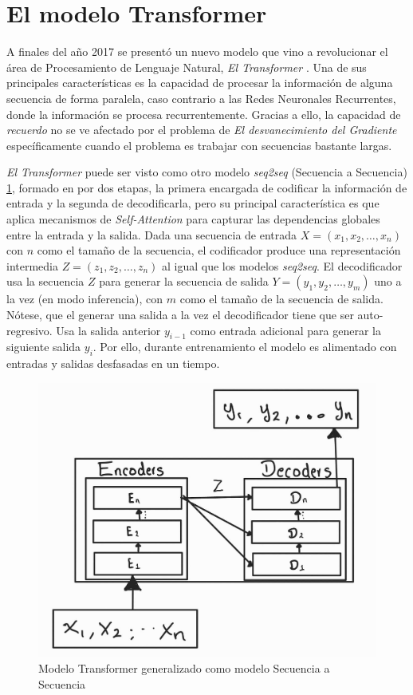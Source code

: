 \section{El modelo Transformer}

A finales del año 2017 se presentó un nuevo modelo que vino a revolucionar el área de Procesamiento
de Lenguaje Natural, \textit{El Transformer} \cite{Vaswani}. Una de sus principales características es la
capacidad de procesar la información de alguna secuencia de forma paralela, caso contrario a las
Redes Neuronales Recurrentes, donde la información se procesa recurrentemente. Gracias a ello,
la capacidad de \textit{recuerdo} no se ve afectado por el problema de \textit{El desvanecimiento
del Gradiente} específicamente cuando el problema es trabajar con secuencias  bastante largas.

\textit{El Transformer} puede ser visto como otro modelo \textit{seq2seq} (Secuencia a Secuencia)
\ref{fig:trans_seq2sqe}, formado en por dos etapas, la primera encargada de codificar la información de entrada
y la segunda de decodificarla, pero su principal característica es que aplica mecanismos de
\textit{Self-Attention} para capturar las dependencias globales entre la entrada y la salida. Dada
una secuencia de entrada $X = (x_1, x_2, \dots, x_n )$ con $n$ como el tamaño de la secuencia,
el codificador produce una representación intermedia
$Z = (z_1, z_2, \dots, z_n)$ al igual que los modelos \textit{seq2seq}. El decodificador usa la
secuencia $Z$ para generar la secuencia de salida
$Y = (y_1, y_2, \dots, y_m)$ uno a la vez (en modo inferencia), con $m$ como el tamaño de la
secuencia de salida. Nótese, que el generar una salida a la vez el decodificador tiene que ser auto-regresivo.
Usa la salida anterior $y_{i-1}$ como entrada adicional para generar la siguiente salida $y_i$. Por
ello, durante entrenamiento el modelo es alimentado con entradas y salidas desfasadas en un tiempo.

\begin{figure}[ht!]
    \centering
    \includegraphics[width=0.4 \textwidth]{Chapters/2. Transformer/Figures/transformer/t_seq2seq.jpg}
    \caption{Modelo Transformer generalizado como modelo Secuencia a Secuencia}
    \label{fig:trans_seq2sqe}
\end{figure}


